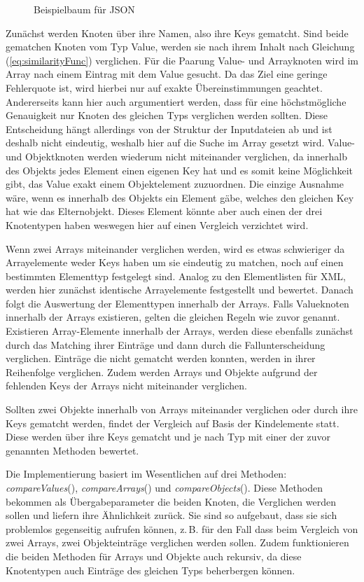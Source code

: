 \begin{figure}
    \centering
    
    \caption{Beispielbaum für JSON}
    \label{fig:jsonBaum}
\end{figure}

Zunächst werden Knoten über ihre Namen, also ihre Keys gematcht. Sind beide gematchen Knoten vom Typ Value, werden sie nach ihrem Inhalt nach Gleichung (\ref{eq:similarityFunc}) verglichen. Für die Paarung Value- und Arrayknoten wird im Array nach einem Eintrag mit dem Value gesucht. Da das Ziel eine geringe Fehlerquote ist, wird hierbei nur auf exakte Übereinstimmungen geachtet. Andererseits kann hier auch argumentiert werden, dass für eine höchstmögliche Genauigkeit nur Knoten des gleichen Typs verglichen werden sollten. Diese Entscheidung hängt allerdings von der Struktur der Inputdateien ab und ist deshalb nicht eindeutig, weshalb hier auf die Suche im Array gesetzt wird. Value- und Objektknoten werden wiederum nicht miteinander verglichen, da innerhalb des Objekts jedes Element einen eigenen Key hat und es somit keine Möglichkeit gibt, das Value exakt einem Objektelement zuzuordnen. Die einzige Ausnahme wäre, wenn es innerhalb des Objekts ein Element gäbe, welches den gleichen Key hat wie das Elternobjekt. Dieses Element könnte aber auch einen der drei Knotentypen haben weswegen hier auf einen Vergleich verzichtet wird. 

Wenn zwei Arrays miteinander verglichen werden, wird es etwas schwieriger da Arrayelemente weder Keys haben um sie eindeutig zu matchen, noch auf einen bestimmten Elementtyp festgelegt sind. Analog zu den Elementlisten für XML, werden hier zunächst identische Arrayelemente festgestellt und bewertet. Danach folgt die Auswertung der Elementtypen innerhalb der Arrays. Falls Valueknoten innerhalb der Arrays existieren, gelten die gleichen Regeln wie zuvor genannt. Existieren Array-Elemente innerhalb der Arrays, werden diese ebenfalls zunächst durch das Matching ihrer Einträge und dann durch die Fallunterscheidung verglichen. Einträge die nicht gematcht werden konnten, werden in ihrer Reihenfolge verglichen. Zudem werden Arrays und Objekte aufgrund der fehlenden Keys der Arrays nicht miteinander verglichen.

Sollten zwei Objekte innerhalb von Arrays miteinander verglichen oder durch ihre Keys gematcht werden, findet der Vergleich auf Basis der Kindelemente statt. Diese werden über ihre Keys gematcht und je nach Typ mit einer der zuvor genannten Methoden bewertet. 

Die Implementierung basiert im Wesentlichen auf drei Methoden: \emph{compareValues}(), \emph{compareArrays}() und \emph{compareObjects}(). Diese Methoden bekommen als Übergabeparameter die beiden Knoten, die Verglichen werden sollen und liefern ihre Ähnlichkeit zurück. Sie sind so aufgebaut, dass sie sich problemlos gegenseitig aufrufen können, z.\,B. für den Fall dass beim Vergleich von zwei Arrays, zwei Objekteinträge verglichen werden sollen. Zudem funktionieren die beiden Methoden für Arrays und Objekte auch rekursiv, da diese Knotentypen auch Einträge des gleichen Typs beherbergen können.

